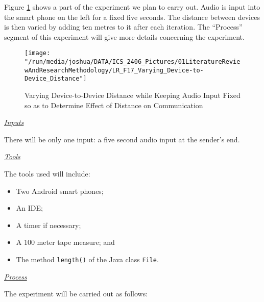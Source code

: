 \documentclass[12pt,svgnames,smaller]{article} %
\begin{document}
\begin{enumerate}
\begin{enumerate}
			Figure \ref{fig:LiteratureReview-Figure17} shows a part of the experiment we plan to carry out. Audio is input into the smart phone on the left for a fixed five seconds. The distance between devices is then varied by adding ten metres to it after each iteration. The “Process” segment of this experiment will give more details concerning the experiment.
						
			\begin{figure}
				\centering
				\texttt{[image: "/run/media/joshua/DATA/ICS\_2406\_Pictures/01LiteratureReviewAndResearchMethodology/LR\_F17\_Varying\_Device-to-Device\_Distance"]}
				\caption{Varying Device-to-Device Distance while Keeping Audio Input Fixed so as to Determine Effect of Distance on Communication }
				\label{fig:LiteratureReview-Figure17}
			\end{figure}
			
			\textsf{\underline{\emph{Inputs}}}
			
			There will be only one input: a five second audio input at the sender’s end.
									
			\emph{\underline{\textsf{Tools}}}
			
			The tools used will include:
			
			\begin{itemize}
				\item Two Android smart phones;
				\item An IDE;
				\item A timer if necessary;
				\item A 100 meter tape measure; and
				\item The method \texttt{length()} of the Java class \texttt{File}.
			\end{itemize}
			
			\emph{\underline{\textsf{Process}}}

			The experiment will be carried out as follows:
			

\end{enumerate}
\end{enumerate}
\end{document}
